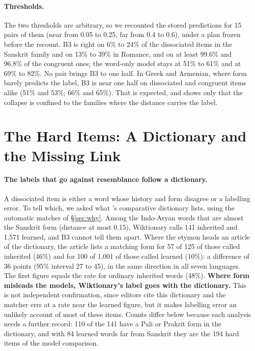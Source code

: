 \documentclass[11pt]{article}
\begin{document}
\paragraph{Thresholds.} The two thresholds are arbitrary, so we recounted the stored predictions for 15 pairs of them (near from 0.05 to 0.25, far from 0.4 to 0.6), under a plan frozen before the recount. B3 is right on 6\% to 24\% of the dissociated items in the Sanskrit family and on 13\% to 39\% in Romance, and on at least 99.6\% and 96.8\% of the congruent ones; the word-only model stays at 51\% to 61\% and at 69\% to 82\%. No pair brings B3 to one half. In Greek and Armenian, where form barely predicts the label, B3 is near one half on dissociated and congruent items alike (51\% and 53\%; 66\% and 65\%). That is expected, and shows only that the collapse is confined to the families where the distance carries the label.

\section{The Hard Items: A Dictionary and the Missing Link}
\label{sec:link}

\paragraph{The labels that go against resemblance follow a dictionary.} A dissociated item is either a word whose history and form disagree or a labelling error. To tell which, we asked what \citeauthor{turner1966cdial}'s comparative dictionary lists, using the automatic matcher of \S\ref{sec:why}. Among the Indo-Aryan words that are almost the Sanskrit form (distance at most 0.15), Wiktionary calls 141 inherited and 1,571 learned, and B3 cannot tell them apart. Where the etymon heads an article of the dictionary, the article lists a matching form for 57 of 125 of those called inherited (46\%) and for 100 of 1,001 of those called learned (10\%): a difference of 36 points (95\% interval 27 to 45), in the same direction in all seven languages. The first figure equals the rate for ordinary inherited words (48\%). \textbf{Where form misleads the models, Wiktionary's label goes with the dictionary.} This is not independent confirmation, since editors cite this dictionary and the matcher errs at a rate near the learned figure, but it makes labelling error an unlikely account of most of these items. Counts differ below because each analysis needs a further record: 110 of the 141 have a Pali or Prakrit form in the dictionary, and with 84 learned words far from Sanskrit they are the 194 hard items of the model comparison.
\end{document}
